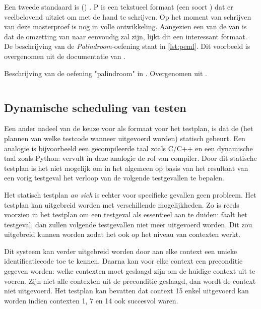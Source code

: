 Een tweede standaard is  () \autocite{peml}.
P is een tekstueel formaat (een soort ) dat er veelbelovend uitziet om met de hand te schrijven.
Op het moment van schrijven van deze masterproef is  nog in volle ontwikkeling.
Aangezien een van de  van  is dat de omzetting van  naar  eenvoudig zal zijn, lijkt dit een interessant formaat.
De beschrijving van de \emph{Palindroom}-oefening staat in \cref{lst:peml}.
Dit voorbeeld is overgenomen uit de documentatie van .

\begin{listing}
    \caption{
        Beschrijving van de oefening "palindroom" in .
        Overgenomen uit \autocite{peml}.
    }
    \label{lst:peml}
    \inputminted{yaml}{code/peml.peml}
\end{listing}


\subsection{Dynamische scheduling van testen}\label{subsec:dynamische-scheduling-van-testen}

Een ander nadeel van de keuze voor  als formaat voor het testplan, is dat de  (het plannen van welke testcode wanneer uitgevoerd worden) statisch gebeurt.
Een analogie is bijvoorbeeld een gecompileerde taal zoals C/C++ en een dynamische taal zoals Python: \tested{} vervult in deze analogie de rol van compiler.
Door dit statische testplan is het niet mogelijk om in het algemeen op basis van het resultaat van een vorig testgeval het verloop van de volgende testgevallen te bepalen.

Het statisch testplan \emph{an sich} is echter voor specifieke gevallen geen probleem.
Het testplan kan uitgebreid worden met verschillende mogelijkheden.
Zo is reeds voorzien in het testplan om een testgeval als essentieel aan te duiden: faalt het testgeval, dan zullen volgende testgevallen niet meer uitgevoerd worden.
Dit zou uitgebreid kunnen worden zodat het ook op het niveau van contexten werkt.

Dit systeem kan verder uitgebreid worden door aan elke context een unieke identificatiecode toe te kennen.
Daarna kan voor elke context een preconditie gegeven worden: welke contexten moet geslaagd zijn om de huidige context uit te voeren.
Zijn niet alle contexten uit de preconditie geslaagd, dan wordt de context niet uitgevoerd.
Het testplan kan bevatten dat context 15 enkel uitgevoerd kan worden indien contexten 1, 7 en 14 ook succesvol waren.

